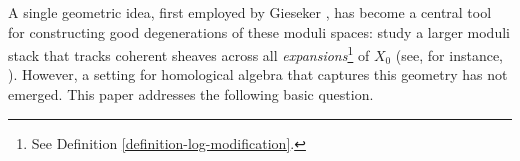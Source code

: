 \documentclass[11pt]{amsart}
\theoremstyle{definition}
\theoremstyle{definition}
\begin{document}
A single geometric idea, first employed by Gieseker \cite{Gieseker1984ADO}, has become a central tool for constructing good degenerations of these moduli spaces: study a larger moduli stack that tracks coherent sheaves across all \textit{expansions}\footnote{See Definition \ref{definition-log-modification}.} of $X_0$ (see, for instance, \cite{GiesekerLi1994,halpern2025quantum,kennedy2023logarithmic,kennedy2025logarithmic,KuhnGluing,Wu-Li-Good-degeneration-of-Quot-schemes-and-coherent-systems,martens2016compactifications,maulik2025logarithmic,nadler2023automorphicgluingfunctorbetti,Nagaraj-Seshadri-Degenerations-of-the-moduli-I,Nagaraj-Seshadri-Degenerations-of-the-moduli-II,shafi2025logarithmic}). However, a setting for homological algebra that captures this geometry has not emerged. This paper addresses the following basic question.
\begin{center} 
\noindent{} 
\end{center}
\end{document}
